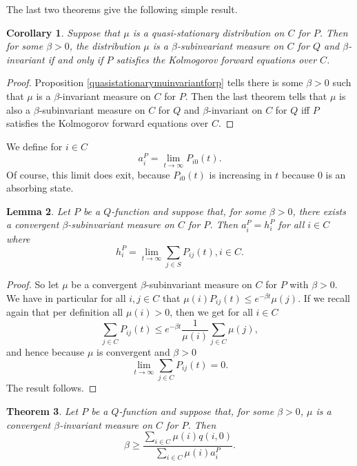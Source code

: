 \documentclass[12pt,a4paper]{scrartcl}
\newtheorem{theorem}{Theorem}[section]
\newtheorem{lemma}[theorem]{Lemma}
\newtheorem{corollary}[theorem]{Corollary}
\numberwithin{equation}{section}
\begin{document}
The last two theorems give the following simple result.

\begin{corollary}
Suppose that $\mu$ is a quasi-stationary distribution on $C$ for $P$. Then for some $\beta > 0$, the distribution $\mu$ is a $\beta$-subinvariant measure on $C$ for $Q$ and $\beta$-invariant if and only if $P$ satisfies the Kolmogorov forward equations over $C$.
\end{corollary}
\begin{proof}
Proposition \ref{quasistationarymuinvariantforp} tells there is some $\beta > 0$ such that $\mu$ is a $\beta$-invariant measure on $C$ for $P$. Then the last theorem tells that $\mu$ is also a $\beta$-subinvariant measure on $C$ for $Q$ and $\beta$-invariant on $C$ for $Q$ iff $P$ satisfies the Kolmogorov forward equations over $C$.
\end{proof}

We define for $i \in C$
$$ a_i^P = \lim_{t \to \infty} P_{i0}\left(t\right).$$
Of course, this limit does exit, because $P_{i0}\left(t\right)$ is increasing in $t$ because $0$ is an absorbing state.

\begin{lemma}
Let $P$ be a $Q$-function and suppose that, for some $\beta > 0$, there exists a convergent $\beta$-subinvariant measure on $C$ for $P$. Then $a_i^P = h_i^P$ for all $i \in C$ where
$$ h_i^P = \lim_{t \to \infty} \sum_{j \in S} P_{ij}\left(t\right), i \in C.$$ 
\end{lemma}
\begin{proof}
So let $\mu$ be a convergent $\beta$-subinvariant measure on $C$ for $P$ with $\beta > 0.$ We have in particular for all $i,j \in C$ that $\mu\left(i\right) P_{ij}\left(t\right) \leq e^{-\beta t}\mu\left(j\right)$. If we recall again that per definition all $\mu\left(i\right) > 0$, then we get for all $i \in C$
$$ \sum_{j \in C} P_{ij}\left(t\right) \leq e^{-\beta t}\frac{1}{\mu\left(i\right)} \sum_{j \in C} \mu\left(j\right),$$
and hence because $\mu$ is convergent and $\beta > 0$
$$ \lim_{t \to \infty} \sum_{j \in C} P_{ij}\left(t\right) = 0.$$
The result follows.
\end{proof}

\begin{theorem}
Let $P$ be a $Q$-function and suppose that, for some $\beta > 0$, $\mu$ is a convergent $\beta$-invariant measure on $C$ for $P$. Then
$$ \beta \geq \frac{\sum_{i \in C} \mu\left(i\right) q\left(i,0\right) }{\sum_{i \in C} \mu\left(i\right) a_i^P}.$$
\end{theorem}
\end{document}
